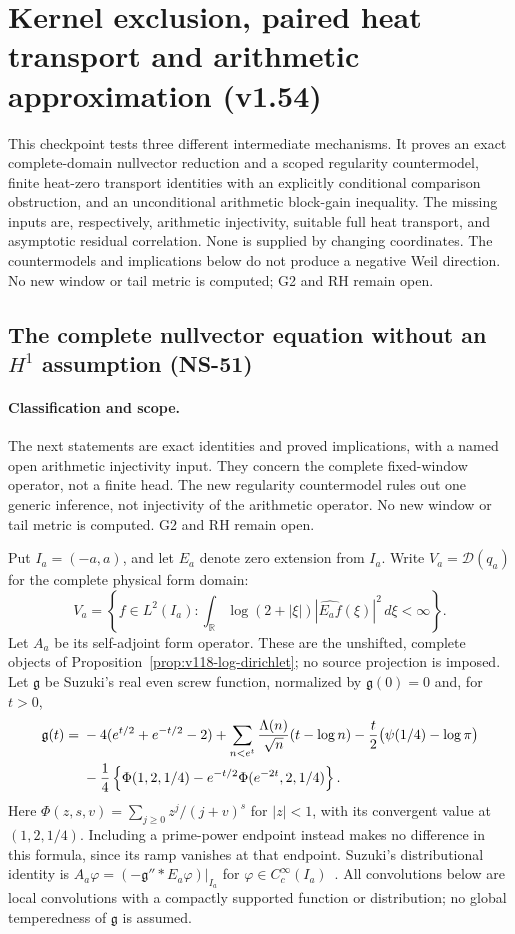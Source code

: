 \section{Kernel exclusion, paired heat transport and arithmetic approximation (v1.54)}
\label{sec:v154-new-shapes}
This checkpoint tests three different intermediate mechanisms. It proves an
exact complete-domain nullvector reduction and a scoped regularity countermodel,
finite heat-zero transport identities with an explicitly conditional comparison
obstruction, and an unconditional arithmetic block-gain inequality. The missing
inputs are, respectively, arithmetic injectivity, suitable full heat transport,
and asymptotic residual correlation. None is supplied by changing coordinates.
The countermodels and implications below do not produce a negative Weil
direction. No new window or tail metric is computed; G2 and RH remain open.

\subsection*{The complete nullvector equation without an $H^1$ assumption (NS-51)}

\paragraph{Classification and scope.}
The next statements are exact identities and proved implications, with a
named open arithmetic injectivity input. They concern the complete
fixed-window operator, not a finite head. The new regularity countermodel
rules out one generic inference, not injectivity of the arithmetic
operator. No new window or tail metric is computed. G2 and RH remain open.

Put $I_a=(-a,a)$, and let $E_a$ denote zero extension from $I_a$.
Write $V_a=\mathcal D(q_a)$ for the complete physical form domain:
\[
 V_a=\left\{f\in L^2(I_a):
  \int_{\mathbb R}\log(2+|\xi|)|\widehat{E_af}(\xi)|^2\,d\xi<\infty\right\}.
\]
Let $A_a$ be its self-adjoint form operator. These are the unshifted,
complete objects of Proposition~\ref{prop:v118-log-dirichlet}; no source
projection is imposed. Let $\mathfrak g$ be Suzuki's real even screw
function, normalized by $\mathfrak g(0)=0$ and, for $t>0$,
\begin{align}
 \mathfrak g(t)={}&-4(e^{t/2}+e^{-t/2}-2)
  +\sum_{n<e^t}\frac{\Lambda(n)}{\sqrt n}(t-\log n)
  -\frac t2\bigl(\psi(1/4)-\log\pi\bigr)\notag\\
 &-\frac14\left\{\Phi(1,2,1/4)
             -e^{-t/2}\Phi(e^{-2t},2,1/4)\right\}.
 \label{eq:ns51-screw}
\end{align}
Here $\Phi(z,s,v)=\sum_{j\ge0}z^j/(j+v)^s$ for $|z|<1$,
with its convergent value at $(1,2,1/4)$. Including a prime-power
endpoint instead makes no difference in this formula, since its ramp
vanishes at that endpoint. Suzuki's distributional identity is
$A_a\varphi=(-\mathfrak g''*E_a\varphi)|_{I_a}$ for
$\varphi\in C_c^\infty(I_a)$~\cite[Sections 2.5 and 3]{Suzuki2026}.
All convolutions below are local convolutions with a compactly supported
function or distribution; no global temperedness of $\mathfrak g$ is
assumed.

